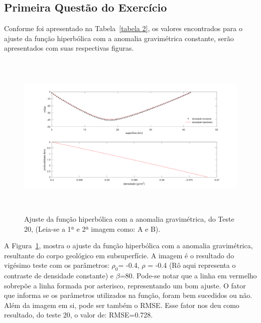 \subsection{Primeira Questão do Exercício}

Conforme foi apresentado na Tabela~\ref{tabela 2}, os valores encontrados para o ajuste da função hiperbólica com a anomalia gravimétrica constante, serão apresentados com suas respectivas figuras.


\begin{figure}[!h]  
        \centering
        \includegraphics[height=8cm]{figure/Imagens 1a questao/Teste20.png}
        \caption{Ajuste da função hiperbólica com a anomalia gravimétrica, do Teste 20, (Leia-se a 1ª e 2ª imagem como: A e B).}
        \label{Figura 2}
        \end{figure}

A Figura~\ref{Figura 2}, mostra o ajuste da função hiperbólica com a anomalia gravimétrica, resultante do corpo geológico em subsuperfície. A imagem é o resultado do vigésimo teste com os parâmetros: $\rho_0$= -0.4, $\rho$ = -0.4 (Rô aqui representa o contraste de densidade constante) e $\beta$=80. Pode-se notar que a linha em vermelho sobrepõe a linha formada por asterisco, representando um bom ajuste. O fator que informa se os parâmetros utilizados na função, foram bem sucedidos ou não. Além da imagem em si, pode ser também o RMSE. Esse fator nos deu como resultado, do teste 20, o valor de: RMSE=0.728.

